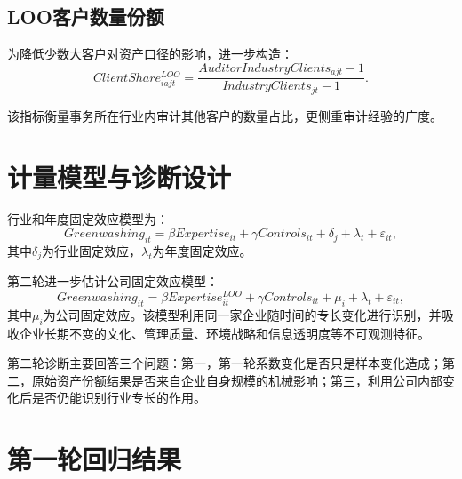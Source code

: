 \documentclass[12pt,a4paper]{article}
\begin{document}
\subsection{LOO客户数量份额}

为降低少数大客户对资产口径的影响，进一步构造：
\begin{equation}
ClientShare^{LOO}_{iajt}=
\frac{AuditorIndustryClients_{ajt}-1}
{IndustryClients_{jt}-1}.
\end{equation}

该指标衡量事务所在行业内审计其他客户的数量占比，更侧重审计经验的广度。

\section{计量模型与诊断设计}

行业和年度固定效应模型为：
\begin{equation}
Greenwashing_{it}=\beta Expertise_{it}+\gamma Controls_{it}
+\delta_j+\lambda_t+\varepsilon_{it},
\end{equation}
其中$\delta_j$为行业固定效应，$\lambda_t$为年度固定效应。

第二轮进一步估计公司固定效应模型：
\begin{equation}
Greenwashing_{it}=\beta Expertise^{LOO}_{it}+\gamma Controls_{it}
+\mu_i+\lambda_t+\varepsilon_{it},
\end{equation}
其中$\mu_i$为公司固定效应。该模型利用同一家企业随时间的专长变化进行识别，并吸收企业长期不变的文化、管理质量、环境战略和信息透明度等不可观测特征。

第二轮诊断主要回答三个问题：第一，第一轮系数变化是否只是样本变化造成；第二，原始资产份额结果是否来自企业自身规模的机械影响；第三，利用公司内部变化后是否仍能识别行业专长的作用。

\section{第一轮回归结果}
\end{document}
